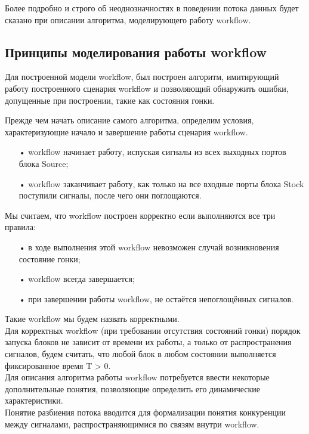 \documentclass[koi8-r,usehyperref,12pt]{G7-32}
\begin{document}
Более подробно и строго об неоднозначностях в поведении потока данных будет сказано при описании алгоритма, моделирующего работу workflow.



\subsection{Принципы моделирования работы workflow}
Для построенной модели workflow, был построен алгоритм, имитирующий работу построенного сценария workflow и позволяющий обнаружить ошибки, допущенные при построении, такие как состояния гонки.

Прежде чем начать описание самого алгоритма, определим условия, характеризующие начало и завершение работы сценария workflow.
\begin{enumerate}
\item[•] workflow начинает работу, испуская сигналы из всех выходных портов блока Source;
\item[•] workflow заканчивает работу, как только на все входные порты блока Stock поступили сигналы, после чего они поглощаются.
\end{enumerate} 

Мы считаем, что workflow построен корректно если выполняются все три правила:
\begin{enumerate}
\item[•] в ходе выполнения этой workflow невозможен случай возникновения состояние гонки;
\item[•] workflow всегда завершается;
\item[•] при завершении работы workflow, не остаётся непоглощённых сигналов.
\end{enumerate}

Такие workflow мы будем назвать корректными.\\

Для корректных workflow (при требовании отсутствия состояний гонки)  порядок запуска блоков не зависит от времени их работы, а только от  распространения сигналов, будем считать, что любой блок в любом состоянии выполняется фиксированное время T > 0.\\

Для описания алгоритма работы workflow потребуется ввести некоторые дополнительные понятия, позволяющие определить его динамические характеристики. \\
Понятие разбиения потока вводится для формализации понятия конкуренции между сигналами, распространяющимися по связям внутри workflow.
\end{document}
